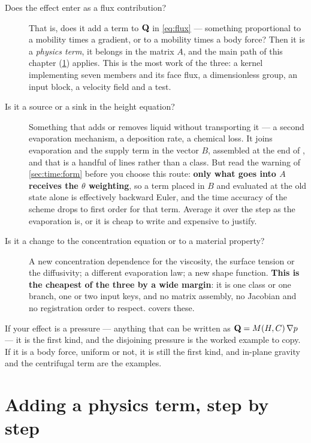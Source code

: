 \begin{description}
  \item[Does the effect enter as a flux contribution?] That is, does it add a
    term to $\mathbf{Q}$ in \cref{eq:flux} --- something proportional to a mobility
    times a gradient, or to a mobility times a body force? Then it is a
    \emph{physics term}, it belongs in the matrix $A$, and the main path of
    this chapter (\cref{sec:extending:term}) applies. This is the most work of
    the three: a kernel implementing seven members and its face flux, a dimensionless group, an
    input block, a velocity field and a test.
  \item[Is it a source or a sink in the height equation?] Something that adds
    or removes liquid without transporting it --- a second evaporation
    mechanism, a deposition rate, a chemical loss. It joins evaporation and the
    supply term in the vector $B$, assembled at the end of
    , and that is a handful
    of lines rather than a class. But read the warning of
    \cref{sec:time:form} before you choose this route: \textbf{only what goes
    into $A$ receives the $\theta$ weighting}, so a term placed in $B$ and
    evaluated at the old state alone is effectively backward Euler, and the
    time accuracy of the scheme drops to first order for that term. Average it
    over the step as the evaporation is, or it is cheap to write and expensive
    to justify.
  \item[Is it a change to the concentration equation or to a material
    property?] A new concentration dependence for the viscosity, the surface
    tension or the diffusivity; a different evaporation law; a new shape
    function. \textbf{This is the cheapest of the three by a wide margin}: it
    is one class or one branch, one or two input keys, and no matrix
    assembly, no Jacobian and no registration order to respect.
     covers these.
\end{description}

If your effect is a pressure --- anything that can be written as
$\mathbf{Q} = M(H,C)\,\nabla p$ --- it is the first kind, and the disjoining
pressure is the worked example to copy. If it is a body force, uniform or not,
it is still the first kind, and in-plane gravity and the centrifugal term are
the examples.

\section{Adding a physics term, step by step}
\label{sec:extending:term}

